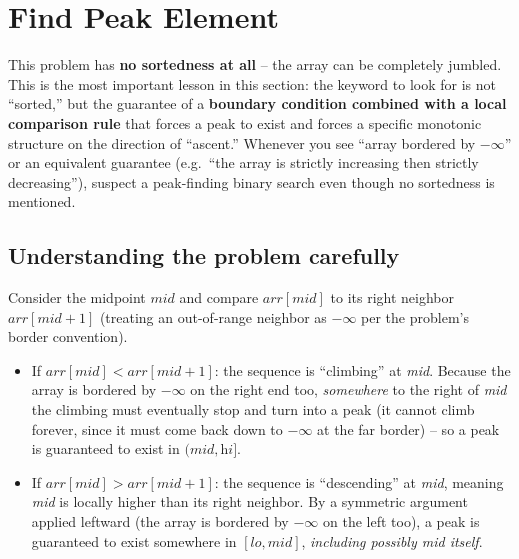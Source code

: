 \section{Find Peak Element}
\label{sec:bs-peak-1d}


\begin{patternbox}
This problem has \textbf{no sortedness at all} -- the array can be
completely jumbled. This is the most important lesson in this section:
the keyword to look for is not ``sorted,'' but the guarantee of a
\textbf{boundary condition combined with a local comparison rule} that
forces a peak to exist and forces a specific monotonic structure on the
direction of ``ascent.'' Whenever you see ``array bordered by $-\infty$''
or an equivalent guarantee (e.g.\ ``the array is strictly increasing then
strictly decreasing''), suspect a peak-finding binary search even though no
sortedness is mentioned.
\end{patternbox}

\subsection*{Understanding the problem carefully}

Consider the midpoint $\textit{mid}$ and compare $\textit{arr}[\textit{mid}]$
to its right neighbor $\textit{arr}[\textit{mid}+1]$ (treating an
out-of-range neighbor as $-\infty$ per the problem's border convention).

\begin{itemize}
  \item If $\textit{arr}[\textit{mid}] < \textit{arr}[\textit{mid}+1]$:
        the sequence is ``climbing'' at \textit{mid}. Because the array is
        bordered by $-\infty$ on the right end too, \emph{somewhere} to the
        right of \textit{mid} the climbing must eventually stop and turn
        into a peak (it cannot climb forever, since it must come back down
        to $-\infty$ at the far border) -- so a peak is guaranteed to exist
        in $(\textit{mid}, \textit{hi}]$.
  \item If $\textit{arr}[\textit{mid}] > \textit{arr}[\textit{mid}+1]$:
        the sequence is ``descending'' at \textit{mid}, meaning
        \textit{mid} is locally higher than its right neighbor. By a
        symmetric argument applied leftward (the array is bordered by
        $-\infty$ on the left too), a peak is guaranteed to exist somewhere
        in $[\textit{lo}, \textit{mid}]$, \emph{including possibly
        \textit{mid} itself}.
\end{itemize}

